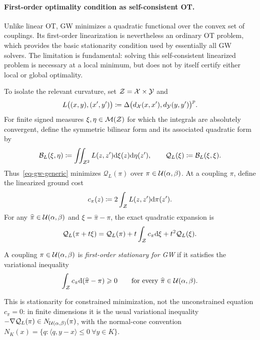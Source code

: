 \paragraph{First-order optimality condition as self-consistent OT.}
Unlike linear OT, GW minimizes a quadratic functional over the convex set of couplings. Its first-order linearization is nevertheless an ordinary OT problem, which provides the basic stationarity condition used by essentially all GW solvers. The limitation is fundamental: solving this self-consistent linearized problem is necessary at a local minimum, but does not by itself certify either local or global optimality.

To isolate the relevant curvature, set $\mathcal Z=\mathcal{X}\times\mathcal{Y}$ and
\[
	L\bigl((x,y),(x',y')\bigr)
	\coloneqq
	\Delta\bigl(d_{\mathcal{X}}(x,x'),d_{\mathcal{Y}}(y,y')\bigr)^p.
\]
For finite signed measures $\xi,\eta\in\mathcal{M}(\mathcal Z)$ for which the integrals are absolutely convergent, define the symmetric bilinear form and its associated quadratic form by
\begin{equation}\label{eq-gw-quadratic-form}
	\mathcal B_L(\xi,\eta)
	\coloneqq
	\iint_{\mathcal Z^2}L(z,z')\mathrm{d}\xi(z)\mathrm{d}\eta(z'),
	\qquad
	\mathcal Q_L(\xi)
	\coloneqq\mathcal B_L(\xi,\xi).
\end{equation}
Thus~\eqref{eq-gw-generic} minimizes $\mathcal Q_L(\pi)$ over $\pi\in\mathcal{U}(\alpha,\beta)$. At a coupling $\pi$, define the linearized ground cost
\begin{equation}\label{eq-gw-linearized-cost}
	c_\pi(z)
	\coloneqq
	2\int_{\mathcal Z}L(z,z')\mathrm{d}\pi(z').
\end{equation}
For any $\widehat\pi\in\mathcal{U}(\alpha,\beta)$ and $\xi=\widehat\pi-\pi$, the exact quadratic expansion is
\begin{equation}\label{eq-gw-exact-linearization}
	\mathcal Q_L(\pi+t\xi)
	=
	\mathcal Q_L(\pi)
	{}+t\int_{\mathcal Z}c_\pi\mathrm{d}\xi
	{}+t^2\mathcal Q_L(\xi).
\end{equation}

\begin{defn}\label{def-gw-stationary-coupling}
	A coupling $\pi\in\mathcal{U}(\alpha,\beta)$ is \emph{first-order stationary for GW} if it satisfies the variational inequality
	\begin{equation}\label{eq-gw-stationary-variational-inequality}
		\int_{\mathcal Z}c_\pi\mathrm{d}(\widehat\pi-\pi)\geqslant0
		\qquad\text{for every }\widehat\pi\in\mathcal{U}(\alpha,\beta).
	\end{equation}
\end{defn}
This is stationarity for constrained minimization, not the unconstrained equation $c_\pi=0$: in finite dimensions it is the usual variational inequality $-\nabla\mathcal Q_L(\pi)\in N_{\mathcal{U}(\alpha,\beta)}(\pi)$, with the normal-cone convention $N_K(x)=\{q:\langle q,y-x\rangle\leq0\ \forall y\in K\}$.

